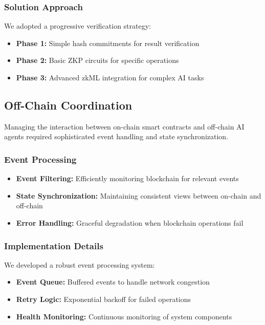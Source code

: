 \subsubsection{Solution Approach}
We adopted a progressive verification strategy:
\begin{itemize}
    \item \textbf{Phase 1:} Simple hash commitments for result verification
    \item \textbf{Phase 2:} Basic ZKP circuits for specific operations
    \item \textbf{Phase 3:} Advanced zkML integration for complex AI tasks
\end{itemize}

\subsection{Off-Chain Coordination}

Managing the interaction between on-chain smart contracts and off-chain AI agents required sophisticated event handling and state synchronization.

\subsubsection{Event Processing}
\begin{itemize}
    \item \textbf{Event Filtering:} Efficiently monitoring blockchain for relevant events
    \item \textbf{State Synchronization:} Maintaining consistent views between on-chain and off-chain
    \item \textbf{Error Handling:} Graceful degradation when blockchain operations fail
\end{itemize}

\subsubsection{Implementation Details}
We developed a robust event processing system:
\begin{itemize}
    \item \textbf{Event Queue:} Buffered events to handle network congestion
    \item \textbf{Retry Logic:} Exponential backoff for failed operations
    \item \textbf{Health Monitoring:} Continuous monitoring of system components
\end{itemize}

